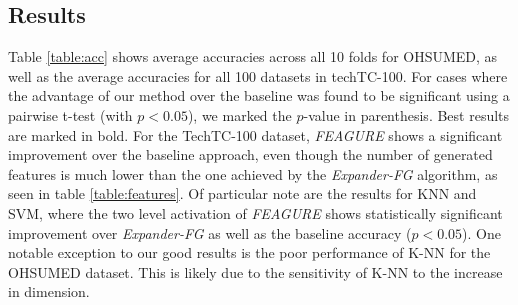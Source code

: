 \documentclass[twoside,11pt]{article}
\theoremstyle{definition}
\begin{document}
\subsection{Results}

Table \ref{table:acc} shows average accuracies across all 10 folds for OHSUMED, as well as the average accuracies for all 100 datasets in techTC-100. For cases where the advantage of our method over the baseline was found to be significant using a pairwise t-test (with $p<0.05$), we marked the $p$-value in parenthesis. Best results are marked in bold.
For the TechTC-100 dataset, \emph{FEAGURE} shows a significant improvement over the baseline approach, even though the number of generated features is much lower than the one achieved by the \emph{Expander-FG} algorithm, as seen in table \ref{table:features}.
Of particular note are the results for KNN and SVM, where the two level activation of \emph{FEAGURE} shows statistically significant improvement over \emph{Expander-FG} as well as the baseline accuracy ($p < 0.05$). 
One notable exception to our good results is the poor performance of K-NN for the OHSUMED dataset. This is likely due to the sensitivity of K-NN to the increase in dimension. 

\end{document}
